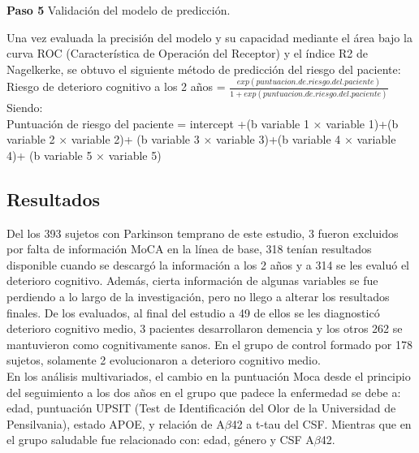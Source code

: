 \begin{description}
			\item {\textbf{Paso 5}} Validación del modelo de predicción.
			
			Una vez evaluada la precisión del modelo y su capacidad mediante el área bajo la curva ROC (Característica de Operación del Receptor) y el índice R2 de Nagelkerke, se obtuvo el siguiente método de predicción del riesgo del paciente:\\
			
			Riesgo de deterioro cognitivo a los 2 años = $\frac{exp(puntuacion.de.riesgo.del.paciente)}{1 + exp(puntuacion.de.riesgo.del.paciente)}$\\
			
			Siendo:\\
			
			Puntuación de riesgo del paciente = intercept +(b variable 1 ×
			variable 1)+(b variable 2 × variable 2)+ (b variable 3 × 
			variable 3)+(b variable 4 × variable 4)+ (b variable 5 ×
			variable 5)
			
		\end{description}
		
		\subsection{Resultados }
		
		Del los 393 sujetos con Parkinson temprano de este estudio, 3 fueron excluidos por falta de información MoCA en la línea de base, 318 tenían resultados disponible cuando se descargó la información a los 2 años y a 314 se les evaluó el deterioro cognitivo. Además, cierta información de algunas variables se fue perdiendo a lo largo de la investigación, pero no llego a alterar los resultados finales. De los evaluados, al final del estudio a 49 de ellos se les diagnosticó deterioro cognitivo medio, 3 pacientes desarrollaron demencia y los otros 262 se mantuvieron como cognitivamente sanos. En el grupo de control formado por 178 sujetos, solamente 2 evolucionaron a deterioro cognitivo medio.\\
		
		En los análisis multivariados, el cambio en la puntuación Moca desde el principio del seguimiento a los dos años en el grupo que padece la enfermedad se debe a: edad, puntuación UPSIT (Test de Identificación del Olor de la Universidad de Pensilvania), 
		estado APOE, y relación de A$\beta$42 a t-tau del CSF. Mientras que en el grupo saludable fue relacionado con: edad, género y CSF A$\beta$42.\\
		
